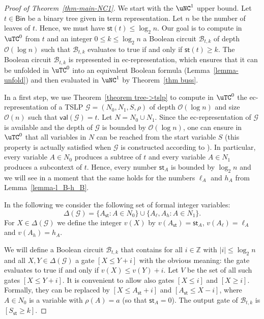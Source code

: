 \documentclass[a4paper,UKenglish,cleveref, autoref, thm-restate, numberwithinsect]{lipics-v2021}
\newcommand{\Bin}{\mathsf{Bin}}
\newcommand{\val}{\mathsf{val}}
\newcommand{\hs}{\mathsf{st}}
\begin{document}
\begin{proof}[Proof of Theorem~\ref{thm-main-NC1}]
We start with the $\uNC^1$ upper bound.
Let $t \in \Bin$ be a binary tree given in term representation. Let $n$ be the number of leaves of $t$. Hence, we must have $\hs(t) \leq \log_2 n$.
Our goal is to compute in $\uTC^0$ from $t$ and an integer $0 \le k \le \log_2 n$ a Boolean circuit $\mathcal{B}_{t,k}$ of depth $\mathcal{O}(\log n)$ such that
$\mathcal{B}_{t,k}$ evaluates to true if and only if $\hs(t) \ge k$. 
The Boolean circuit $\mathcal{B}_{t,k}$ is represented in ec-representation, which ensures that it can be unfolded
in $\uTC^0$ into an equivalent Boolean formula (Lemma~\ref{lemma-unfold}) and then evaluated in $\uNC^1$ by Theorem~\ref{thm buss}.

In a first step, we use Theorem~\ref{theorem tree->tslp} to
compute in $\uTC^0$ the ec-representation of a TSLP 
$\mathcal{G} = (N_0, N_1, S, \rho)$ of depth $\mathcal{O}(\log n)$ and size $\mathcal{O}(n)$ such that $\val(\mathcal{G}) = t$.
Let $N = N_0 \cup N_1$. Since the ec-representation of $\mathcal{G}$ is available and 
the depth of $\mathcal{G}$ is bounded by $\mathcal{O}(\log n)$, one can ensure in $\uTC^0$ that
all variables in $N$ can be reached from the start variable $S$ (this property is actually satisfied when $\mathcal{G}$ is constructed
according to \cite{GanardiL19}). In particular, every variable $A \in N_0$ produces a subtree of $t$ and every variable $A \in N_1$
produces a subcontext of $t$.
Hence, every number $\hs_A$ is bounded by $\log_2 n$ and we will see in a moment that the same holds for the numbers $\ell_A$ and $h_A$
from Lemma~\ref{lemma-l_B-h_B}.

In the following we consider the following set of formal integer variables:
$$
\Delta(\mathcal{G}) = \{ A_\hs : A \in N_0 \} \cup \{ A_\ell , A_h : A \in N_1 \} .
$$
For $X \in \Delta(\mathcal{G})$ we define the integer $v(X)$ by $v(A_\hs) = \hs_A$, 
$v(A_\ell) = \ell_A$ and $v(A_h) = h_A$.

We will define a Boolean circuit $\mathcal{B}_{t,k}$ that contains for all $i \in \mathbb{Z}$ with 
$|i| \leq \log_2 n$ and 
all $X, Y \in \Delta(\mathcal{G})$ a gate $[X \leq Y + i]$ with the obvious meaning: the gate evaluates to true if and only if
$v(X) \leq v(Y) + i$. 
Let $V$ be the set of all such gates $[X \leq Y + i]$.
It is convenient to allow also gates $[X \leq i]$ and $[X \geq i]$. Formally, they can be replaced
by $[X \leq A_\hs + i]$ and $[A_\hs \leq X - i]$, where $A \in N_0$ is a variable with $\rho(A) = a$ (so that $\hs_A = 0$).
The output gate of $\mathcal{B}_{t,k}$ is $[S_\hs \ge k]$.


\end{proof}
\end{document}
